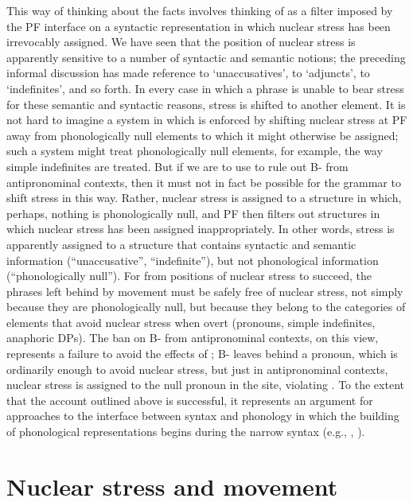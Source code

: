 \documentclass[output=paper]{LSP/langsci}
\begin{document}
This way of thinking about the facts involves thinking of  as a filter imposed by the PF interface on a syntactic representation in which nuclear stress has been irrevocably assigned.  We have seen that the position of nuclear stress is apparently sensitive to a number of syntactic and semantic notions; the preceding informal discussion has made {reference} to ‘unaccusatives’, to ‘adjuncts’, to ‘indefinites’, and so forth.  In every case in which a phrase is unable to bear stress for these semantic and syntactic reasons, stress is shifted to another element.  It is not hard to imagine a system in which  is enforced by shifting nuclear stress at PF away from phonologically null elements to which it might otherwise be assigned; such a system might treat phonologically null elements, for example, the way simple indefinites are treated.  But if we are to use  to rule out B- from antipronominal contexts, then it must not in fact be possible for the grammar to shift stress in this way.  Rather, nuclear stress is assigned to a structure in which, perhaps, nothing is phonologically null, and PF then filters out structures in which nuclear stress has been assigned inappropriately.  In other words, stress is apparently assigned to a structure that contains syntactic and semantic information (``unaccusative'', ``indefinite''), but not phonological information (``phonologically null'').  For  from positions of nuclear stress to succeed, the phrases left behind by movement must be safely free of nuclear stress, not simply because they are phonologically null, but because they belong to the categories of elements that avoid nuclear stress when overt (pronouns, simple indefinites, anaphoric DPs).  The ban on B- from antipronominal contexts, on this view, represents a failure to avoid the effects of ; B- leaves behind a pronoun, which is ordinarily enough to avoid nuclear stress, but just in antipronominal contexts, nuclear stress is assigned to the null pronoun in the  site, violating .  To the extent that the account outlined above is successful, it represents an argument for approaches to the interface between syntax and phonology in which the building of phonological representations begins during the narrow syntax (e.g., \citealt{Bresnan1971}, \citealt{Richards2016}).  

\section{Nuclear stress and movement}\label{sec:richards:4}
\end{document}
